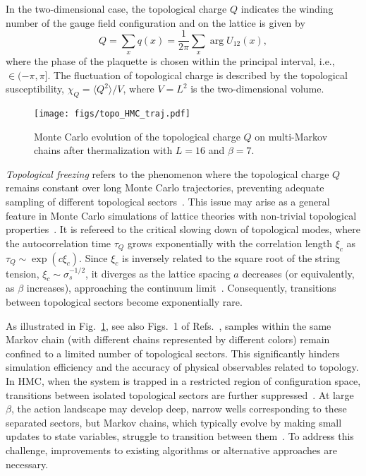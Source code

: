 \documentclass[a4paper,11pt]{article}
\begin{document}
In the two-dimensional case, the topological charge $Q$ indicates the winding number of the gauge field configuration and on the lattice is given by
\begin{equation}
    Q = \sum_x q(x) = \frac{1}{2\pi} \sum_x \arg U_{12}(x),
\end{equation}
where the phase of the plaquette is chosen within the principal interval, i.e., $\in (-\pi, \pi]$. The fluctuation of topological charge is described by the topological susceptibility, $\chi_Q = \langle Q^2\rangle/V$, where $V = L^2$ is the two-dimensional volume. 

\begin{figure}[hbpt!]
    \begin{center}
    \texttt{[image: figs/topo\_HMC\_traj.pdf]}
    \caption{Monte Carlo evolution of the topological charge $Q$ on multi-Markov chains after thermalization with $L=16$ and $\beta=7$.}
    \label{fig:topof}
    \end{center}
\end{figure}

\textit{Topological freezing} refers to the phenomenon where the topological charge $ Q $ remains constant over long Monte Carlo trajectories, preventing adequate sampling of different topological sectors~\cite{Kanwar:2020xzo,Albandea:2021kwe}. This issue may arise as a general feature in Monte Carlo simulations of lattice theories with non-trivial topological properties~\cite{Alles:1996vn,DelDebbio:2002xa,DelDebbio:2004xh,Bonanno:2018xtd,Eichhorn:2023uge}. It is refereed to the critical slowing down of topological modes, where the autocorrelation time $\tau_Q$ grows exponentially with the correlation length $\xi_c$ as $\tau_Q \sim \exp(c \xi_c)$. Since $\xi_c$ is inversely related to the square root of the string tension, $\xi_c \sim \sigma_s^{-1/2}$, it diverges as the lattice spacing $ a $ decreases (or equivalently, as $\beta$ increases), approaching the continuum limit~\cite{Schaefer:2010hu}. Consequently, transitions between topological sectors become exponentially rare. 



As illustrated in Fig.~\ref{fig:topof}, see also Figs.~1 of Refs.~\cite{Kanwar:2020xzo,Albandea:2021kwe}, samples within the same Markov chain (with different chains represented by different colors) remain confined to a limited number of topological sectors. This significantly hinders simulation efficiency and the accuracy of physical observables related to topology. In HMC, when the system is trapped in a restricted region of configuration space, transitions between isolated topological sectors are further suppressed~\cite{Alles:1996vn,DelDebbio:2001sj}. At large $\beta$, the action landscape may develop deep, narrow wells corresponding to these separated sectors, but Markov chains, which typically evolve by making small updates to state variables, struggle to transition between them~\cite{2001Annealed,Eichhorn:2023uge}. To address this challenge, improvements to existing algorithms or alternative approaches are necessary.
\end{document}
